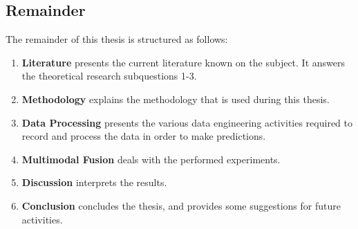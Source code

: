 \subsection{Remainder}

The remainder of this thesis is structured as follows:

\begin{enumerate}
\addtocounter{enumi}{1}
\item \textbf{Literature} presents the current literature known on the subject. It answers the theoretical research subquestions 1-3. 
\item \textbf{Methodology} explains the methodology that is used during this thesis.
\item \textbf{Data Processing} presents the various data engineering activities required to record and process the data in order to make predictions.
\item \textbf{Multimodal Fusion} deals with the performed experiments.
\item \textbf{Discussion} interprets the results.
\item \textbf{Conclusion} concludes the thesis, and provides some suggestions for future activities.

\end{enumerate}

